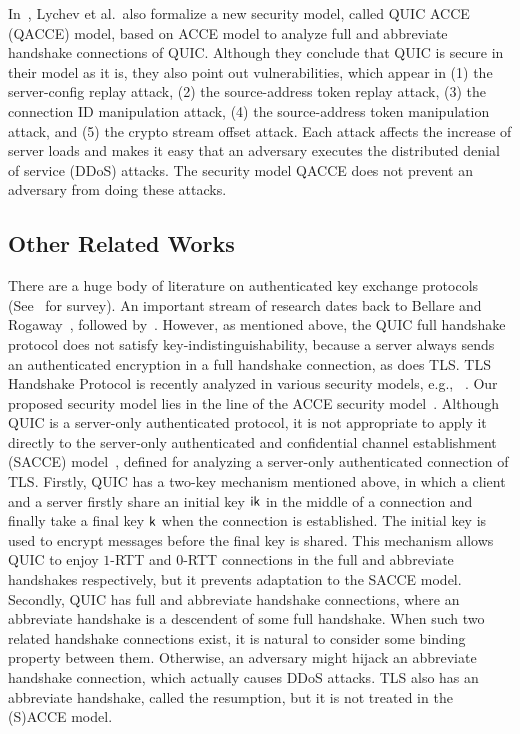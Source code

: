 In~\cite{LJBN15:QUIC}, Lychev et al.~also formalize a new security model, called QUIC ACCE (QACCE) model,
based on ACCE model to analyze full and abbreviate handshake connections of QUIC.
Although they conclude that QUIC is secure in their model as it is,
they also point out vulnerabilities, which appear in
(1) the server-config replay attack, (2) the source-address token replay attack,
(3) the connection ID manipulation attack, (4) the source-address token manipulation attack,
and (5) the crypto stream offset attack.
Each attack affects the increase of server loads and makes it easy that
an adversary executes the distributed denial of service (DDoS) attacks.
The security model QACCE does not prevent an adversary from doing these attacks.


\subsection{Other Related Works} \label{sec:Related Work}
There are a huge body of literature on authenticated key exchange protocols
(See~\cite{CK01:AKE,JKSS12:ACCE,KPW13:SACCE} for survey).
An important stream of research dates back to Bellare and Rogaway~\cite{BR93:AKE},
followed by~\cite{DB96,Blei98,JMDP00,Kraw01,JB02,KK05:TLS,KCRE08,SMOAJ08,EK09,KTT11}.
However, as mentioned above, the QUIC full handshake protocol does not satisfy key-indistinguishability,
because a server always sends an authenticated encryption in a full handshake connection, as does TLS.
TLS Handshake Protocol is recently analyzed in various security models,
e.g., ~\cite{JKSS12:ACCE,KPW13:SACCE,FS13:ACCE,GKS13:RACCE,BDKSS14:SSH,BFKPSB14:TLS}.
Our proposed security model lies in the line of
the ACCE security model~\cite{JKSS12:ACCE,KPW13:SACCE}.
Although QUIC is a server-only authenticated protocol,
it is not appropriate to apply it directly to
the server-only authenticated and confidential channel establishment
(SACCE) model~\cite{KPW13:SACCE}, defined for analyzing
a server-only authenticated connection of TLS.
Firstly, QUIC has a two-key mechanism mentioned above,
in which a client and a server firstly share an initial
key $\mathsf{ik}$ in the middle of a connection and finally take a final key $\mathsf{k}$ when the connection is established.
The initial key is used to encrypt messages before the final key is shared.
This mechanism allows QUIC to enjoy $1$-RTT and $0$-RTT connections in the full and abbreviate handshakes
respectively, but it prevents adaptation to the SACCE model.
Secondly, QUIC has full and abbreviate handshake connections, where
an abbreviate handshake is a descendent  of some full handshake.
When such two related handshake connections exist,
it is natural to consider some binding property between them.
Otherwise, an adversary might hijack an abbreviate handshake connection,
which actually causes DDoS attacks.
TLS also has an abbreviate handshake, called the resumption, but
it is not treated in the (S)ACCE model.

